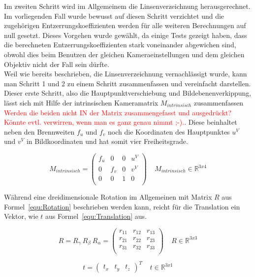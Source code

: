 \begin{description}
Im zweiten Schritt wird im Allgemeinem die Linsenverzeichnung herausgerechnet. Im vorliegenden Fall wurde bewusst auf diesen Schritt verzichtet und die zugehörigen Entzerrungskoeffizienten werden für alle weiteren Berechnungen auf null gesetzt. Dieses Vorgehen wurde gewählt, da einige Tests gezeigt haben, dass die berechneten Entzerrungskoeffizienten stark voneinander abgewichen sind, obwohl dies beim Benutzen der gleichen Kameraeinstellungen und dem gleichen Objektiv nicht der Fall sein dürfte.\\
Weil wie bereits beschrieben, die Linsenverzeichnung vernachlässigt wurde, kann man Schritt 1 und 2 zu einem Schritt zusammenfassen und vereinfacht darstellen. Dieser erste Schritt, also die Hauptpunktverschiebung und Bildebenenverkippung, lässt sich mit Hilfe der intrinsischen Kameramatrix $M_{intrinsisch}$ zusammenfassen \textcolor{red}{Werden die beiden nicht IN der Matrix zusammengefasst und ausgedrückt? Könnte evtl. verwirren, wenn man es ganz genau nimmt ;-).}. Diese beinhaltet neben den Brennweiten $f_u$ und $f_v$ noch die Koordinaten des Hauptpunktes $u^V$ und $v^V$ in Bildkoordinaten und hat somit vier Freiheitsgrade.

\begin{equation}
\label{equ:intrinsic}
M_{intrinsisch} = 
\begin{pmatrix}
f_u & 0 & 0 & u^V \\
0 & f_v & 0 & v^V\\
0 & 0 & 1 & 0 \\
\end{pmatrix} 
~ ~ ~ ~ ~M_{intrinsisch} \in \mathbb{R}^{3x4}
\end{equation}

Während eine dreidimensionale Rotation im Allgemeinen mit Matrix $R$ aus Formel~\ref{equ:Rotation} beschrieben werden kann, reicht für die Translation ein Vektor, wie $t$ aus Formel~\ref{equ:Translation} aus.\

\begin{equation}
\label{equ:Rotation}
R= R_\gamma ~R_\beta ~R_\alpha =
\begin{pmatrix}
r_{11} & r_{12} & r_{13} \\
r_{21} & r_{22} & r_{23} \\
r_{31} & r_{32} & r_{33} \\
\end{pmatrix}
~ ~ ~ ~ ~R \in \mathbb{R}^{3x3}
\end{equation}

\begin{equation}
\label{equ:Translation}
t=
\begin{pmatrix}
t_x & t_y & t_z
\end{pmatrix}^T
~ ~ ~ ~ ~t \in \mathbb{R}^{3x1} 
\end{equation}


\end{description}
